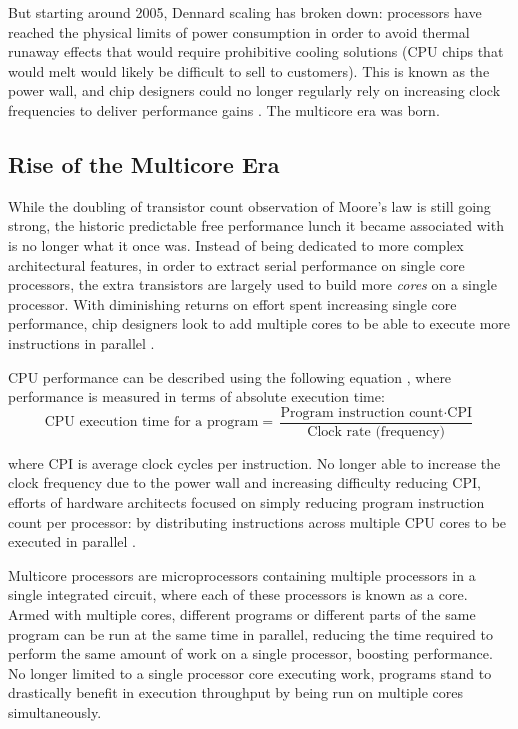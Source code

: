 \documentclass[bsc,frontabs,singlespacing,parskip,deptreport,normalheadings]{infthesis}
\begin{document}
But starting around 2005, Dennard scaling has broken down: processors have
reached the physical limits of power consumption in order to avoid thermal
runaway effects that would require prohibitive cooling solutions (CPU chips that
would melt would likely be difficult to sell to customers). This is known as the
power wall, and chip designers could no longer regularly rely on increasing
clock frequencies to deliver performance gains \cite{parkhurst_single_2006}. The
multicore era was born.

\subsection{Rise of the Multicore Era}
\label{section:rise_of_the_multicore_era}

While the doubling of transistor count observation of Moore's law is still going
strong, the historic predictable free performance lunch it became associated
with is no longer what it once was. Instead of being dedicated to more complex
architectural features, in order to extract serial performance on single core
processors, the extra transistors are largely used to build more \textit{cores}
on a single processor. With diminishing returns on effort spent increasing
single core performance, chip designers look to add multiple cores to be able to
execute more instructions in parallel \cite{patterson_trouble_2010}.

CPU performance can be described using the following equation
\cite{patterson_computer_2021}, where performance is measured in terms of
absolute execution time: \[ \text{CPU execution time for a program} =
\frac{\text{Program instruction count} \cdot \text{CPI}}{\text{Clock rate
(frequency)}} \]

where CPI is average clock cycles per instruction. No longer able to increase
the clock frequency due to the power wall and increasing difficulty reducing
CPI, efforts of hardware architects focused on simply reducing program
instruction count per processor: by distributing instructions across multiple
CPU cores to be executed in parallel \cite{etiemble_45-year_2018}.

Multicore processors are microprocessors containing multiple processors in a
single integrated circuit, where each of these processors is known as a core.
Armed with multiple cores, different programs or different parts of the same
program can be run at the same time in parallel, reducing the time required to
perform the same amount of work on a single processor, boosting performance. No
longer limited to a single processor core executing work, programs stand to
drastically benefit in execution throughput by being run on multiple cores
simultaneously.
\end{document}
